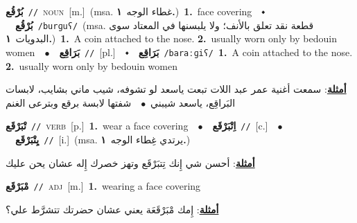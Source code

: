 \documentclass[10pt,a4paper,twoside]{article} %
\begin{document}
\begin{multicols}{2}
{\setlength\topsep{0pt}\textbf{\foreignlanguage{arabic}{بُرْقُع}}\ {\color{gray}\texttt{//}\color{black}}\ \textsc{noun}\ [m.]\ \color{gray}(msa. \foreignlanguage{arabic}{غطاء الوجه}~\foreignlanguage{arabic}{\textbf{١.}})\color{black}\ \textbf{1.}~face covering\ \ $\smblkdiamond$\ \ \setlength\topsep{0pt}\textbf{\foreignlanguage{arabic}{بُرْقُع}}\ {\color{gray}\texttt{/burɡuʕ/}\color{black}}\ \color{gray}(msa. \foreignlanguage{arabic}{قطعة نقد تعلق بالأنف؛ ولا يلبسنها في المعتاد سوى البدويات}~\foreignlanguage{arabic}{\textbf{١.}})\color{black}\ \textbf{1.}~A coin attached to the nose.  \textbf{2.}~usually worn only by bedouin women\ \ $\bullet$\ \ \setlength\topsep{0pt}\textbf{\foreignlanguage{arabic}{بَرَاقِع}}\ {\color{gray}\texttt{//}\color{black}}\ [pl.]\ \ $\smblkdiamond$\ \ \setlength\topsep{0pt}\textbf{\foreignlanguage{arabic}{بَرَاقِع}}\ {\color{gray}\texttt{/baraːɡiʕ/}\color{black}}\ \textbf{1.}~A coin attached to the nose.  \textbf{2.}~usually worn only by bedouin women\  \begin{flushright}\color{gray}\foreignlanguage{arabic}{\textbf{\underline{\foreignlanguage{arabic}{أمثلة}}}: سمعت أغنية عمر عبد اللات تبعت ياسعد لو تشوفه، شيب ماني بشايب، لابسات البَراقِع، ياسعد شيبني\ $\bullet$\ \  شفتها لابسة برقع وبترعى الغنم}\end{flushright}\color{black}} \vspace{2mm}

{\setlength\topsep{0pt}\textbf{\foreignlanguage{arabic}{تْبَرْقَع}}\ {\color{gray}\texttt{//}\color{black}}\ \textsc{verb}\ [p.]\ \textbf{1.}~wear a face covering\ \ $\bullet$\ \ \setlength\topsep{0pt}\textbf{\foreignlanguage{arabic}{اِتْبَرْقَع}}\ {\color{gray}\texttt{//}\color{black}}\ [c.]\ \ $\bullet$\ \ \setlength\topsep{0pt}\textbf{\foreignlanguage{arabic}{يِتْبَرْقَع}}\ {\color{gray}\texttt{//}\color{black}}\ [i.]\ \color{gray}(msa. \foreignlanguage{arabic}{يرتدي غِطاء الوجه}~\foreignlanguage{arabic}{\textbf{١.}})\color{black}\  \begin{flushright}\color{gray}\foreignlanguage{arabic}{\textbf{\underline{\foreignlanguage{arabic}{أمثلة}}}: أحسن شي إِنك تِتبَرْقَع وتهز خصرك إِله عشان يحن عليك}\end{flushright}\color{black}} \vspace{2mm}

{\setlength\topsep{0pt}\textbf{\foreignlanguage{arabic}{مْبَرْقَع}}\ {\color{gray}\texttt{//}\color{black}}\ \textsc{adj}\ [m.]\ \textbf{1.}~wearing a face covering\  \begin{flushright}\color{gray}\foreignlanguage{arabic}{\textbf{\underline{\foreignlanguage{arabic}{أمثلة}}}: إِمك مْبَرْقَعَة يعني عشان حضرتك تتشرَّط علي؟}\end{flushright}\color{black}} \vspace{2mm}


\end{multicols}
\end{document}
